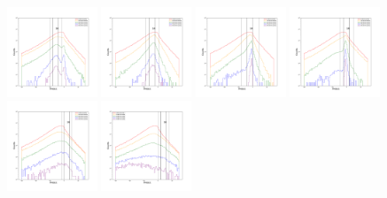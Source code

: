 \documentclass[12pt,prd]{article}
\begin{document}
\begin{figure}[h!]
\includegraphics[width=0.24\textwidth]{../figures/scanning_plotsgaiascan_l315_0_b66_4_ra197_7_dec4_0_npy_10.pdf}
\includegraphics[width=0.24\textwidth]{../figures/scanning_plotsgaiascan_l315_0_b66_4_ra197_7_dec4_0_npy_11.pdf}
\includegraphics[width=0.24\textwidth]{../figures/scanning_plotsgaiascan_l315_0_b66_4_ra197_7_dec4_0_npy_12.pdf}
\includegraphics[width=0.24\textwidth]{../figures/scanning_plotsgaiascan_l315_0_b66_4_ra197_7_dec4_0_npy_13.pdf}
\includegraphics[width=0.24\textwidth]{../figures/scanning_plotsgaiascan_l315_0_b66_4_ra197_7_dec4_0_npy_14.pdf}
\includegraphics[width=0.24\textwidth]{../figures/scanning_plotsgaiascan_l315_0_b66_4_ra197_7_dec4_0_npy_15.pdf}

\end{figure}
\end{document}
